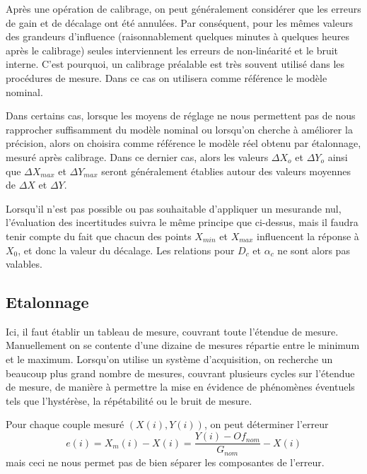 Après une opération de calibrage, on peut généralement considérer que les erreurs de gain et de décalage ont été annulées. Par conséquent, pour les mêmes valeurs des grandeurs d'influence (raisonnablement quelques minutes à quelques heures après le calibrage) seules interviennent les erreurs de non-linéarité et le bruit interne. C'est pourquoi, un calibrage préalable est très souvent utilisé dans les procédures de mesure. Dans ce cas on utilisera comme référence le modèle nominal.

Dans certains cas, lorsque les moyens de réglage ne nous permettent pas de nous rapprocher suffisamment du modèle nominal ou lorsqu'on cherche à améliorer la précision, alors on choisira comme référence le modèle réel obtenu par étalonnage, mesuré après calibrage. Dans ce dernier cas, alors les valeurs $\Delta X_{o}$ et $\Delta Y_{o}$ ainsi que $\Delta X_{max}$ et $\Delta Y_{max}$ seront généralement établies autour des valeurs moyennes de $\Delta X$ et $\Delta Y$.

Lorsqu'il n'est pas possible ou pas souhaitable d'appliquer un mesurande nul, l'évaluation des incertitudes suivra le même principe que ci-dessus, mais il faudra tenir compte du fait que chacun des points $X_{min}$ et $X_{max}$ influencent la réponse à $X_{0}$, et donc la valeur du décalage. Les relations pour $D_{c}$ et $\alpha_{c}$ ne sont alors pas valables.

\subsection{Etalonnage}

Ici, il faut établir un tableau de mesure, couvrant toute l'étendue de mesure. Manuellement on se contente d'une dizaine de mesures répartie entre le minimum et le maximum. Lorsqu'on utilise un système d'acquisition, on recherche un beaucoup plus grand nombre de mesures, couvrant plusieurs cycles sur l'étendue de mesure, de manière à permettre la mise en évidence de phénomènes éventuels tels que l'hystérèse, la répétabilité ou le bruit de mesure.

Pour chaque couple mesuré $(X(i), Y(i))$, on peut déterminer l'erreur
\[
e(i) = X_m(i) - X(i) = \frac{Y(i) - Of_{nom}}{G_{nom}}   -X(i)
\]
mais ceci ne nous permet pas de bien séparer les composantes de l'erreur.

